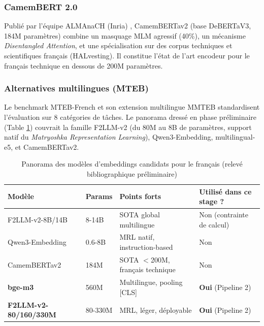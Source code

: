 \documentclass[11pt]{article}
\begin{document}
\subsubsection{CamemBERT 2.0}
Publié par l'équipe ALMAnaCH (Inria) \cite{martin2024camembert}, CamemBERTav2 (base DeBERTaV3, 184M
paramètres) combine un masquage MLM agressif (40\%), un mécanisme
\emph{Disentangled Attention}, et une spécialisation sur des corpus techniques
et scientifiques français (HALvesting). Il constitue l'état de l'art
encodeur pour le français technique en dessous de 200M paramètres.

\subsubsection{Alternatives multilingues (MTEB)}
Le benchmark MTEB-French \cite{kerboua2024mtebfrench} et son extension
multilingue MMTEB \cite{enevoldsen2025mmteb} standardisent l'évaluation sur 8
catégories de tâches. Le panorama dressé en phase préliminaire (Table
\ref{tab:mteb}) couvrait la famille F2LLM-v2 (du 80M au 8B de paramètres,
support natif du \emph{Matryoshka Representation Learning}), Qwen3-Embedding,
multilingual-e5, et CamemBERTav2.

\begin{table}[h!]
\centering
\caption{Panorama des modèles d'embeddings candidats pour le français (relevé bibliographique préliminaire)}
\label{tab:mteb}
\vspace{0.4em}\small
\begin{tabular}{@{}llll@{}}
\toprule
\textbf{Modèle} & \textbf{Params} & \textbf{Points forts} & \textbf{Utilisé dans ce stage ?} \\ \midrule
F2LLM-v2-8B/14B & 8-14B & SOTA global multilingue & Non (contrainte de calcul) \\
Qwen3-Embedding & 0.6-8B & MRL natif, instruction-based & Non \\
CamemBERTav2 & 184M & SOTA $<$200M, français technique & Non \\
\textbf{bge-m3} & 560M & Multilingue, pooling [CLS] & \textbf{Oui} (Pipeline 2) \\
\textbf{F2LLM-v2-80/160/330M} & 80-330M & MRL, léger, déployable & \textbf{Oui} (Pipeline 2) \\
\bottomrule
\end{tabular}
\end{table}
\end{document}
